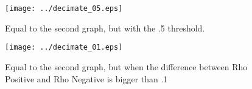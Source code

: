 \documentclass[11pt]{amsart}
\theoremstyle{definition} \newtheorem{defi}{Definition}
\begin{document}
\begin{figure}[h]
\centering
\texttt{[image: ../decimate\_05.eps]}
\caption{Equal to the second graph, but with the .5 threshold.} 
\label{fig:Labs_Histogram}
\end{figure}

\begin{figure}[h]
\centering
\texttt{[image: ../decimate\_01.eps]}
\caption{Equal to the second graph, but when the difference between Rho Positive and Rho Negative is bigger than .1} 
\label{fig:Labs_Histogram}
\end{figure}



\end{document}
